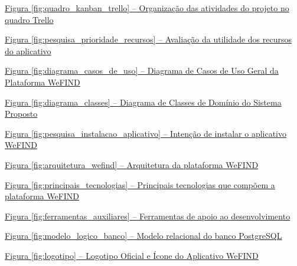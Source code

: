 \noindent \hyperref[fig:quadro_kanban_trello]{Figura \ref*{fig:quadro_kanban_trello} -- Organização das atividades do projeto no quadro Trello \dotfill \pageref{fig:quadro_kanban_trello}}\par\vspace{0.12cm}
\noindent \hyperref[fig:pesquisa_prioridade_recursos]{Figura \ref*{fig:pesquisa_prioridade_recursos} -- Avaliação da utilidade dos recursos do aplicativo \dotfill \pageref{fig:pesquisa_prioridade_recursos}}\par\vspace{0.12cm}
\noindent \hyperref[fig:diagrama_casos_de_uso]{Figura \ref*{fig:diagrama_casos_de_uso} -- Diagrama de Casos de Uso Geral da Plataforma WeFIND \dotfill \pageref{fig:diagrama_casos_de_uso}}\par\vspace{0.12cm}
\noindent \hyperref[fig:diagrama_classes]{Figura \ref*{fig:diagrama_classes} -- Diagrama de Classes de Domínio do Sistema Proposto \dotfill \pageref{fig:diagrama_classes}}\par\vspace{0.12cm}
\noindent \hyperref[fig:pesquisa_instalacao_aplicativo]{Figura \ref*{fig:pesquisa_instalacao_aplicativo} -- Intenção de instalar o aplicativo WeFIND \dotfill \pageref{fig:pesquisa_instalacao_aplicativo}}\par\vspace{0.12cm}
\noindent \hyperref[fig:arquitetura_wefind]{Figura \ref*{fig:arquitetura_wefind} -- Arquitetura da plataforma WeFIND \dotfill \pageref{fig:arquitetura_wefind}}\par\vspace{0.12cm}
\noindent \hyperref[fig:principais_tecnologias]{Figura \ref*{fig:principais_tecnologias} -- Principais tecnologias que compõem a plataforma WeFIND \dotfill \pageref{fig:principais_tecnologias}}\par\vspace{0.12cm}
\noindent \hyperref[fig:ferramentas_auxiliares]{Figura \ref*{fig:ferramentas_auxiliares} -- Ferramentas de apoio ao desenvolvimento \dotfill \pageref{fig:ferramentas_auxiliares}}\par\vspace{0.12cm}
\noindent \hyperref[fig:modelo_logico_banco]{Figura \ref*{fig:modelo_logico_banco} -- Modelo relacional do banco PostgreSQL \dotfill \pageref{fig:modelo_logico_banco}}\par\vspace{0.12cm}
\noindent \hyperref[fig:logotipo]{Figura \ref*{fig:logotipo} -- Logotipo Oficial e Ícone do Aplicativo WeFIND \dotfill \pageref{fig:logotipo}}\par\vspace{0.12cm}
